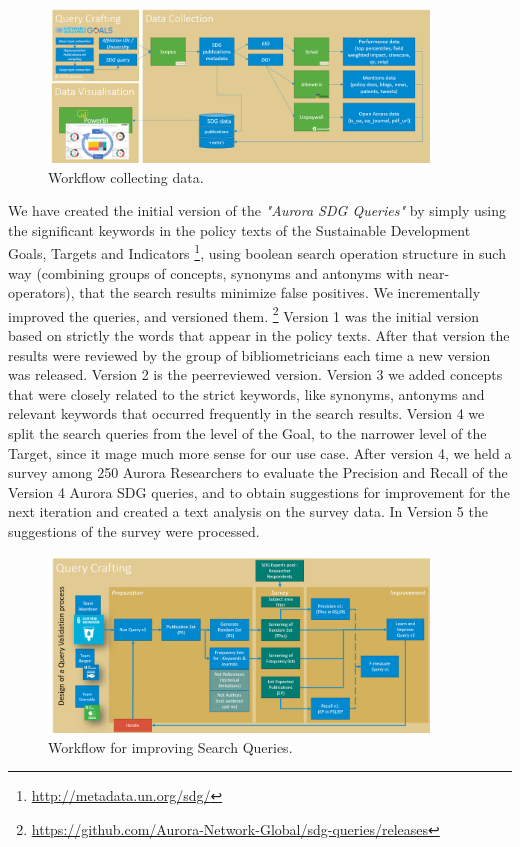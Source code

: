 \documentclass{article}
\begin{document}
\begin{figure}[ht]
	\centering
  \includegraphics[width=0.9\textwidth]{figures/sdg-data-workflow.png}
	\caption{Workflow collecting data.}
	\label{sdgdataworkflow}
\end{figure}

We have created the initial version of the \emph{"Aurora SDG Queries"} by simply using the significant keywords in the policy texts of the Sustainable Development Goals, Targets and Indicators \footnote{\url{http://metadata.un.org/sdg/}}, using boolean search operation structure in such way (combining groups of concepts, synonyms and antonyms with near-operators), that the search results minimize false positives. We incrementally improved the queries, and versioned them. \footnote{\url{https://github.com/Aurora-Network-Global/sdg-queries/releases}} Version 1 was the initial version based on strictly the words that appear in the policy texts. After that version the results were reviewed by the group of bibliometricians each time a new version was released. Version 2 is the peerreviewed version. Version 3 we added concepts that were closely related to the strict keywords, like synonyms, antonyms and relevant keywords that occurred frequently in the search results. Version 4 we split the search queries from the level of the Goal, to the narrower level of the Target, since it mage much more sense for our use case. After version 4, we held a survey \cite{vanderfeesten_survey_2020} among 250 Aurora Researchers to evaluate the Precision and Recall of the Version 4 Aurora SDG queries, and to obtain suggestions for improvement for the next iteration and created a text analysis \cite{vanderfeesten_text_2020} on the survey data. In Version 5 the suggestions of the survey were processed. 

\begin{figure}[ht]
	\centering
  \includegraphics[width=0.9\textwidth]{figures/sdg-query-crafting.png}
	\caption{Workflow for improving Search Queries.}
	\label{improvingsearchqueries}
\end{figure}
\end{document}
